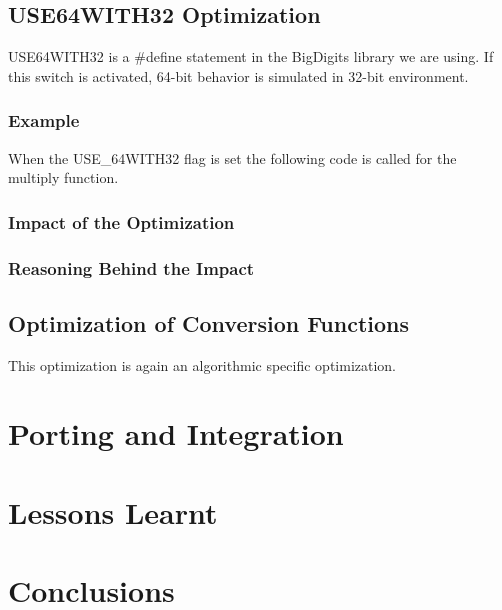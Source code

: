 \documentclass[a4paper]{article}
\begin{document}
\subsection{USE64WITH32 Optimization}
	USE64WITH32 is a $\#$define statement in the BigDigits library we are using. If this switch is activated, 64-bit behavior is simulated in 32-bit environment.
	\subsubsection{Example}
		When the USE\_64WITH32 flag is set the following code is called for the multiply function.
		
	\subsubsection{Impact of the Optimization}
	\subsubsection{Reasoning Behind the Impact}
\subsection{Optimization of Conversion Functions}
	This optimization is again an algorithmic specific optimization. 
\section{Porting and Integration}

\section{Lessons Learnt}

\section{Conclusions}
\end{document}
